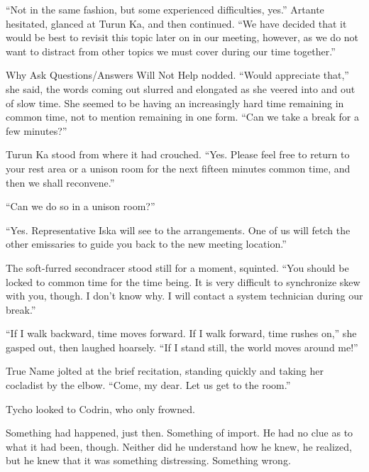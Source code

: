 ``Not in the same fashion, but some experienced difficulties, yes.'' Artante hesitated, glanced at Turun Ka, and then continued. ``We have decided that it would be best to revisit this topic later on in our meeting, however, as we do not want to distract from other topics we must cover during our time together.''

Why Ask Questions/Answers Will Not Help nodded. ``Would appreciate that,'' she said, the words coming out slurred and elongated as she veered into and out of slow time. She seemed to be having an increasingly hard time remaining in common time, not to mention remaining in one form. ``Can we take a break for a few minutes?''

Turun Ka stood from where it had crouched. ``Yes. Please feel free to return to your rest area or a unison room for the next fifteen minutes common time, and then we shall reconvene.''

``Can we do so in a unison room?''

``Yes. Representative Iska will see to the arrangements. One of us will fetch the other emissaries to guide you back to the new meeting location.''

The soft-furred secondracer stood still for a moment, squinted. ``You should be locked to common time for the time being. It is very difficult to synchronize skew with you, though. I don't know why. I will contact a system technician during our break.''

``If I walk backward, time moves forward. If I walk forward, time rushes on,'' she gasped out, then laughed hoarsely. ``If I stand still, the world moves around me!''

True Name jolted at the brief recitation, standing quickly and taking her cocladist by the elbow. ``Come, my dear. Let us get to the room.''

Tycho looked to Codrin, who only frowned.

Something had happened, just then. Something of import. He had no clue as to what it had been, though. Neither did he understand how he knew, he realized, but he knew that it was something distressing. Something wrong.
